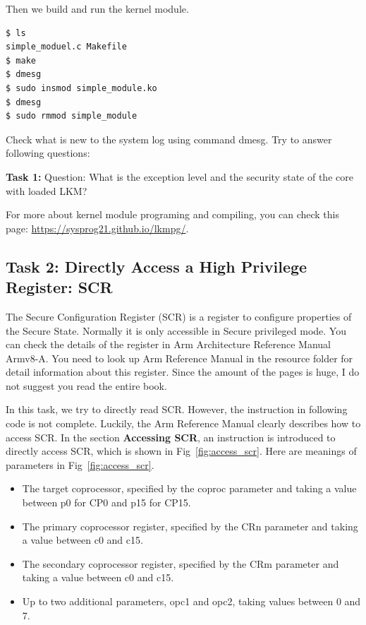 Then we build and run the kernel module. 

\begin{lstlisting}
$ ls
simple_moduel.c Makefile
$ make
$ dmesg
$ sudo insmod simple_module.ko
$ dmesg
$ sudo rmmod simple_module
\end{lstlisting}


Check what is new to the system log
using command dmesg. Try to answer following questions:

\textbf{Task 1:} Question: What is the exception level and the security state of the core with loaded LKM?

For more about kernel module programing and compiling, you can check this page:
\url{https://sysprog21.github.io/lkmpg/}.

\subsection{Task 2: Directly Access a High Privilege Register: SCR}

The Secure Configuration Register (SCR) is a register to configure properties of the Secure State. Normally it is only accessible in Secure privileged mode. You can check the details of the register in Arm Architecture Reference Manual Armv8-A. You need to look up Arm Reference Manual in the resource folder for detail information about this register. Since the amount of the pages is huge, I do not suggest you read the entire book.


In this task, we try to directly read SCR. However, the instruction in following code is not complete. Luckily, the Arm Reference Manual clearly describes how to access SCR. In the section \textbf{Accessing SCR}, an instruction is introduced to directly access SCR, which is shown in Fig~\ref{fig:access_scr}. Here are meanings of parameters in Fig~\ref{fig:access_scr}. 

\begin{itemize}
  \item The target coprocessor, specified by the coproc parameter and taking a value between p0 for CP0 and p15 for CP15.
  \item The primary coprocessor register, specified by the CRn parameter and taking a value between c0 and c15.
  \item The secondary coprocessor register, specified by the CRm parameter and taking a value between c0 and c15.
  \item Up to two additional parameters, opc1 and opc2, taking values between 0 and 7.
\end{itemize}

